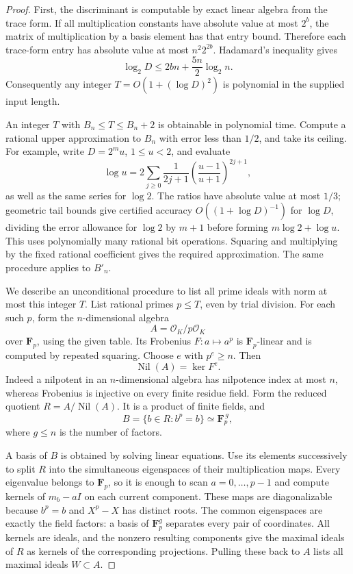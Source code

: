 \begin{proof}
First, the discriminant is computable by exact linear algebra
from the trace form. If all multiplication constants have
absolute value at most \(2^b\), the matrix of multiplication
by a basis element has that entry bound. Therefore each
trace-form entry has absolute value at most \(n^2 2^{2b}\).
Hadamard's inequality gives
\[
       \log_2 D\le 2bn+\frac{5n}{2}\log_2 n.                  \tag{C12.1}
\]
Consequently any integer \(T=O(1+(\log D)^2)\) is polynomial
in the supplied input length.

An integer \(T\) with \(B_n\le T\le B_n+2\) is obtainable
in polynomial time. Compute a rational upper approximation
to \(B_n\) with error less than \(1/2\), and take its ceiling.
For example, write \(D=2^m u\), \(1\le u<2\), and evaluate
\[
 \log u=2\sum_{j\ge0}
       \frac{1}{2j+1}\left(\frac{u-1}{u+1}\right)^{2j+1},
\]
as well as the same series for \(\log2\).
The ratios have absolute value at most \(1/3\); geometric
tail bounds give certified accuracy \(O((1+\log D)^{-1})\)
for \(\log D\), dividing the error allowance for \(\log2\)
by \(m+1\) before forming \(m\log2+\log u\).
This uses polynomially many rational bit operations. Squaring
and multiplying by the fixed rational coefficient gives
the required approximation. The same procedure applies
to \(B'_n\).

We describe an unconditional procedure to list all prime
ideals with norm at most this integer \(T\).
List rational primes \(p\le T\), even by trial division.
For each such \(p\), form the \(n\)-dimensional algebra
\[
                   A=\mathcal O_K/p\mathcal O_K
\]
over \(\mathbf F_p\), using the given table. Its Frobenius
\(F:a\mapsto a^p\) is \(\mathbf F_p\)-linear and is
computed by repeated squaring. Choose \(e\) with \(p^e\ge n\).
Then
\[
                   \operatorname{Nil}(A)=\ker F^e.           \tag{C12.2}
\]
Indeed a nilpotent in an \(n\)-dimensional algebra has
nilpotence index at most \(n\), whereas Frobenius is
injective on every finite residue field. Form the reduced
quotient \(R=A/\operatorname{Nil}(A)\). It is a product of
finite fields, and
\[
          B=\{b\in R:b^p=b\}\simeq\mathbf F_p^{\,g},
                                                               \tag{C12.3}
\]
where \(g\le n\) is the number of factors.

A basis of \(B\) is obtained by solving linear equations.
Use its elements successively to split \(R\) into the
simultaneous eigenspaces of their multiplication maps.
Every eigenvalue belongs to \(\mathbf F_p\), so it is enough
to scan \(a=0,\ldots,p-1\) and compute kernels of
\(m_b-aI\) on each current component. These maps are
diagonalizable because \(b^p=b\) and \(X^p-X\) has distinct
roots. The common eigenspaces are exactly the field factors:
a basis of \(\mathbf F_p^g\) separates every pair of
coordinates. All kernels are ideals, and the nonzero
resulting components give the maximal ideals of \(R\)
as kernels of the corresponding projections. Pulling
these back to \(A\) lists all maximal ideals \(W\subset A\).


\end{proof}
